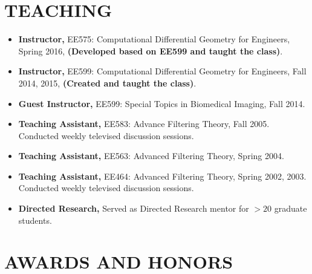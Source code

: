 \documentclass[overlapped,line,letterpaper]{res}
\begin{document}
\begin{resume}
\section{\bf TEACHING}
\begin{itemize}
\item \textbf{Instructor,} EE575: Computational Differential Geometry for Engineers, Spring 2016, \textbf{(Developed  based on EE599 and taught the class)}. 
\item \textbf{Instructor,} EE599: Computational Differential Geometry for Engineers, Fall 2014, 2015, \textbf{(Created and taught the class)}. 
\item \textbf{Guest Instructor,} EE599: Special Topics in Biomedical Imaging, Fall 2014. 
\item \textbf{Teaching Assistant,} EE583: Advance Filtering Theory, Fall 2005. Conducted weekly televised discussion sessions. 
\item \textbf{Teaching Assistant,} EE563: Advanced Filtering Theory, Spring 2004. 
\item \textbf{Teaching Assistant,} EE464: Advanced Filtering Theory, Spring 2002, 2003. Conducted weekly televised discussion sessions. 
\item \textbf{Directed Research,} Served as Directed Research mentor for $>20$ graduate students.

\end{itemize}

\section{\bf AWARDS AND HONORS}


\end{resume}
\end{document}

